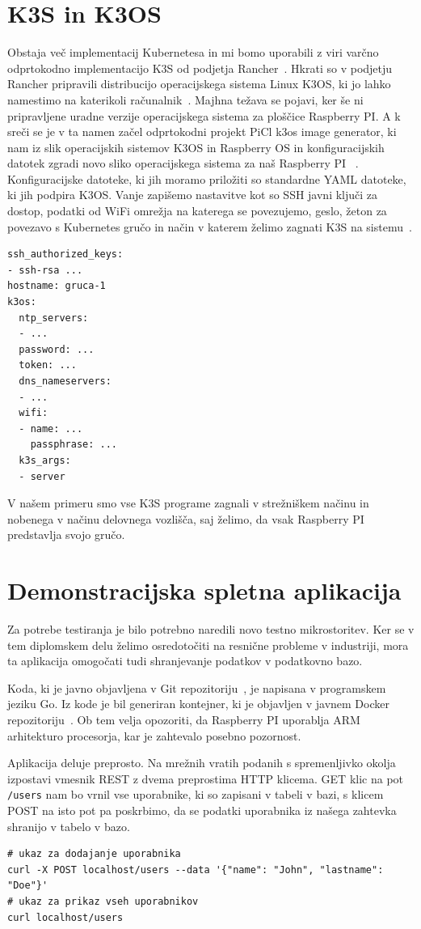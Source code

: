 \documentclass[a4paper, 12pt]{book}
\begin{document}
\section{K3S in K3OS}
Obstaja več implementacij Kubernetesa in mi bomo uporabili z viri varčno odprtokodno implementacijo K3S od podjetja Rancher~\cite{k3s-info}.
Hkrati so v podjetju Rancher pripravili distribucijo operacijskega sistema Linux K3OS, ki jo lahko namestimo na katerikoli računalnik~\cite{k3os-git}. 
Majhna težava se pojavi, ker še ni pripravljene uradne verzije operacijskega sistema za ploščice Raspberry PI.
A k sreči se je v ta namen začel odprtokodni projekt PiCl k3os image generator, ki nam iz slik operacijskih sistemov K3OS in Raspberry OS in konfiguracijskih datotek zgradi novo sliko operacijskega sistema za naš Raspberry PI ~\cite{k3os-rpi-image-generator}.
Konfiguracijske datoteke, ki jih moramo priložiti so standardne YAML datoteke, ki jih podpira K3OS.
Vanje zapišemo nastavitve kot so SSH javni ključi za dostop, podatki od WiFi omrežja na katerega se povezujemo, geslo, žeton za povezavo s Kubernetes gručo in način v katerem želimo zagnati K3S na sistemu~\cite{k3os-git}.
\begin{verbatim}
ssh_authorized_keys:
- ssh-rsa ...
hostname: gruca-1
k3os:
  ntp_servers:
  - ...
  password: ...
  token: ...
  dns_nameservers:
  - ... 
  wifi:
  - name: ...
    passphrase: ...
  k3s_args:
  - server
\end{verbatim}
V našem primeru smo vse K3S programe zagnali v strežniškem načinu in nobenega v načinu delovnega vozlišča, saj želimo, da vsak Raspberry PI predstavlja svojo gručo.
\section{Demonstracijska spletna aplikacija}
Za potrebe testiranja je bilo potrebno naredili novo testno mikrostoritev.
Ker se v tem diplomskem delu želimo osredotočiti na resnične probleme v industriji, mora ta aplikacija omogočati tudi shranjevanje podatkov v podatkovno bazo.

Koda, ki je javno objavljena v Git repozitoriju~\cite{git-stateful-rest-sample}, je napisana v programskem jeziku Go.
Iz kode je bil generiran kontejner, ki je objavljen v javnem Docker repozitoriju~\cite{docker-stateful-rest-sample}.
Ob tem velja opozoriti, da Raspberry PI uporablja ARM arhitekturo procesorja, kar je zahtevalo posebno pozornost.

Aplikacija deluje preprosto.
Na mrežnih vratih podanih s spremenljivko okolja izpostavi vmesnik REST z dvema preprostima HTTP klicema.
GET klic na pot \verb|/users| nam bo vrnil vse uporabnike, ki so zapisani v tabeli v bazi, s klicem POST na isto pot pa poskrbimo, da se podatki uporabnika iz našega zahtevka shranijo v tabelo v bazo.
\begin{verbatim}
# ukaz za dodajanje uporabnika
curl -X POST localhost/users --data '{"name": "John", "lastname": "Doe"}'
# ukaz za prikaz vseh uporabnikov
curl localhost/users
\end{verbatim}
\end{document}
